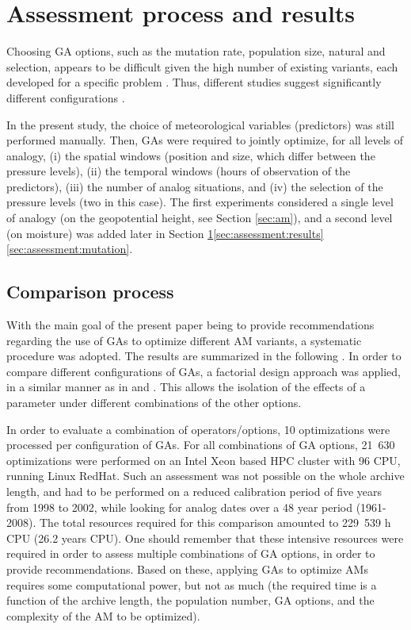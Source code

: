 \documentclass{ametsoc}
\begin{document}
\section{Assessment process and results}
\label{sec:assessment}

Choosing GA options, such as the mutation rate, population size, natural and selection, appears to be difficult given the high number of existing variants, each developed for a specific problem \citep{Haupt2004, Costa2007a}. Thus, different studies suggest significantly different configurations \citep{DeJong1975a, Grefenstette1986, Back1996a, Back1996b}.

In the present study, the choice of meteorological variables (predictors) was still performed manually. Then, GAs were required to jointly optimize, for all levels of analogy, (i) the spatial windows (position and size, which differ between the pressure levels), (ii) the temporal windows (hours of observation of the predictors), (iii) the number of analog situations, and (iv) the selection of the pressure levels (two in this case). The first experiments considered a single level of analogy (on the geopotential height, see Section \ref{sec:am}), and a second level (on moisture) was added later in Section \ref{sec:assessment}\ref{sec:assessment:results}\ref{sec:assessment:mutation}.


\subsection{Comparison process}

With the main goal of the present paper being to provide recommendations regarding the use of GAs to optimize different AM variants, a systematic procedure was adopted. The results are summarized in the following \citep[see][for the details]{Horton2012a}. In order to compare different configurations of GAs, a factorial design approach was applied, in a similar manner as in \citet{Costa2005a,Costa2007a} and \citet{Mariano2010a}. This allows the isolation of the effects of a parameter under different combinations of the other options.

In order to evaluate a combination of operators/options, 10 optimizations were processed per configuration of GAs. For all combinations of GA options, 21~630 optimizations were performed on an Intel Xeon based HPC cluster with 96 CPU, running Linux RedHat. Such an assessment was not possible on the whole archive length, and had to be performed on a reduced calibration period of five years from 1998 to 2002, while looking for analog dates over a 48 year period (1961-2008). The total resources required for this comparison amounted to 229~539 h CPU (26.2 years CPU). One should remember that these intensive resources were required in order to assess multiple combinations of GA options, in order to provide recommendations. Based on these, applying GAs to optimize AMs requires some computational power, but not as much (the required time is a function of the archive length, the population number, GA options, and the complexity of the AM to be optimized). 
\end{document}
